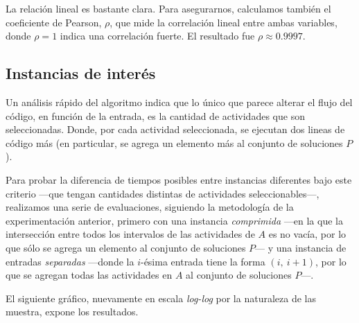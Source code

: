La relación lineal es bastante clara. Para asegurarnos, calculamos también el coeficiente de Pearson, $\rho$, que mide la correlación lineal entre ambas variables, donde $\rho = 1$ indica una correlación fuerte. El resultado fue $\rho \approx 0.9997$.

\subsection{Instancias de interés}

Un análisis rápido del algoritmo indica que lo único que parece alterar el flujo del código, en función de la entrada, es 
la cantidad de actividades que son seleccionadas. Donde, por cada actividad seleccionada, se ejecutan dos lineas de código más (en particular, se agrega un elemento más al conjunto de soluciones $P$). %

Para probar la diferencia de tiempos posibles entre instancias diferentes bajo este criterio ---que tengan cantidades distintas de actividades seleccionables---, realizamos una serie de evaluaciones, siguiendo la metodología de la experimentación anterior, primero con una instancia \textit{comprimida} ---en la que la intersección entre todos los intervalos de las actividades de $A$ es no vacía, por lo que sólo se agrega un elemento al conjunto de soluciones $P$--- y una instancia de entradas \textit{separadas} ---donde la $i$-ésima entrada tiene la forma $(i,\ i+1)$, por lo que se agregan todas las actividades en $A$ al conjunto de soluciones $P$---. 

El siguiente gráfico, nuevamente en escala \textit{log-log} por la naturaleza de las muestra, expone los resultados.

